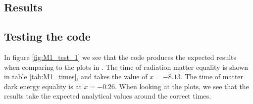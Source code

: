 \documentclass{aa}
\begin{document}
\subsection{Results}

\subsection{Testing the code}
In figure \ref{fig:M1_test_1} we see that the code produces the expected results when comparing to the plots in \cite{winther:2023}. The time of radiation matter equality is
shown in table \ref{tab:M1_times}, and takes the value of $x=-8.13$. The time of matter dark energy equality is at $x = -0.26$. When looking at the plots, we see that 
the results take the expected analytical values around the correct times.  
\end{document}
